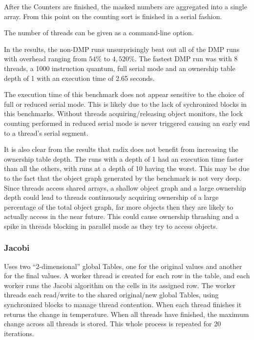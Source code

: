 After the Counters are finished, the masked numbers are aggregated
into a single array.  From this point on the counting sort is finished
in a serial fashion.

The number of threads can be given as a command-line option.

In the results, the non-DMP runs unsurprisingly beat out all of the
DMP runs with overhead ranging from $54\%$ to $4,520\%$.  The fastest
DMP run was with 8 threads, a 1000 instruction quantum, full serial
mode and an ownership table depth of 1 with an execution time of 2.65
seconds.

The execution time of this benchmark does not appear sensitive to the
choice of full or reduced serial mode.  This is likely due to the lack
of sychronized blocks in this benchmarks.  Without threads
acquiring/releasing object monitors, the lock counting performed in
reduced serial mode is never triggered causing an early end to a
thread's serial segment.

It is also clear from the results that radix does not benefit from
increasing the ownership table depth.  The runs with a depth of 1 had
an execution time faster than all the others, with runs at a depth of
10 having the worst.  This may be due to the fact that the object
graph generated by the benchmark is not very deep.  Since threads
access shared arrays, a shallow object graph and a large ownership
depth could lead to threads continuously acquiring ownership of a
large percentage of the total object graph, far more objects then they
are likely to actually access in the near future.  This could cause
ownership thrashing and a spike in threads blocking in parallel mode
as they try to access objects.


\subsubsection{Jacobi}

Uses two ``2-dimensional'' global Tables, one for the original values
and another for the final values.  A worker thread is created for each
row in the table, and each worker runs the Jacobi algorithm on the
cells in its assigned row.  The worker threads each read/write to the
shared original/new global Tables, using synchronized blocks to manage
thread contention.  When each thread finishes it returns the change in
temperature.  When all threads have finished, the maximum change
across all threads is stored.  This whole process is repeated for 20
iterations.

